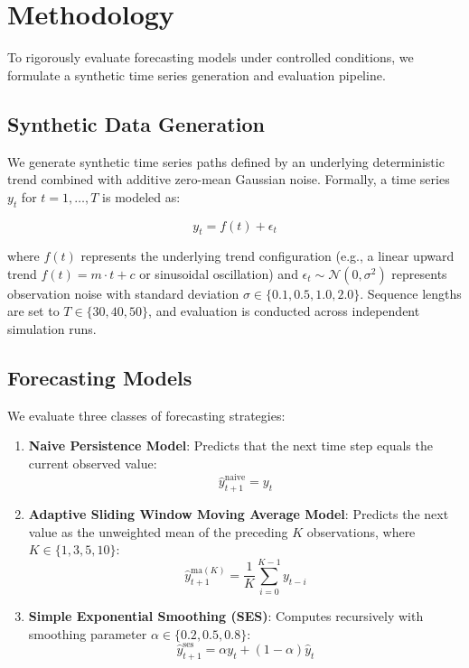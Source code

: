 \documentclass[11pt,letterpaper]{article}
\begin{document}
\section{Methodology}

To rigorously evaluate forecasting models under controlled conditions, we formulate a synthetic time series generation and evaluation pipeline.

\subsection{Synthetic Data Generation}

We generate synthetic time series paths defined by an underlying deterministic trend combined with additive zero-mean Gaussian noise. Formally, a time series $y_t$ for $t = 1, \dots, T$ is modeled as:

$$y_t = f(t) + \epsilon_t$$

where $f(t)$ represents the underlying trend configuration (e.g., a linear upward trend $f(t) = m \cdot t + c$ or sinusoidal oscillation) and $\epsilon_t \sim \mathcal{N}(0, \sigma^2)$ represents observation noise with standard deviation $\sigma \in \{0.1, 0.5, 1.0, 2.0\}$. Sequence lengths are set to $T \in \{30, 40, 50\}$, and evaluation is conducted across independent simulation runs.

\subsection{Forecasting Models}

We evaluate three classes of forecasting strategies:

\begin{enumerate}
  \item \textbf{Naive Persistence Model}: Predicts that the next time step equals the current observed value:
  $$\hat{y}_{t+1}^{\text{naive}} = y_t$$

  \item \textbf{Adaptive Sliding Window Moving Average Model}: Predicts the next value as the unweighted mean of the preceding $K$ observations, where $K \in \{1, 3, 5, 10\}$:
  $$\hat{y}_{t+1}^{\text{ma}(K)} = \frac{1}{K} \sum_{i=0}^{K-1} y_{t-i}$$

  \item \textbf{Simple Exponential Smoothing (SES)}: Computes recursively with smoothing parameter $\alpha \in \{0.2, 0.5, 0.8\}$:
  $$\hat{y}_{t+1}^{\text{ses}} = \alpha y_t + (1 - \alpha) \hat{y}_t$$
\end{enumerate}
\end{document}
